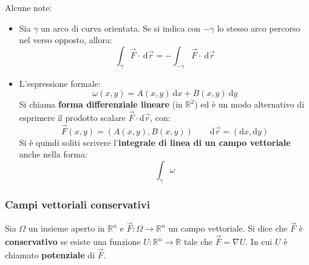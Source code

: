 \documentclass[a4paper]{article}
\newcommand{\definition}[1]{\textcolor{Red3}{\textbf{#1}}}
\begin{document}
	\noindent
	Alcune note:
	\begin{itemize}
		\item Sia $\gamma$ un arco di curva orientata. Se si indica con $-\gamma$ lo stesso arco percorso nel verso opposto, allora:
		\begin{equation*}
			\displaystyle\int_{\gamma} \overset{\rightarrow}{F} \cdot \:\mathrm{d}\overset{\rightarrow}{r} 
			=
			- \displaystyle\int_{-\gamma} \overset{\rightarrow}{F} \cdot \:\mathrm{d}\overset{\rightarrow}{r}
		\end{equation*}

		\item L'espressione formale:
		\begin{equation*}
			\omega\left(x,y\right) = A\left(x,y\right) \:\mathrm{d}x + B\left(x,y\right) \:\mathrm{d}y
		\end{equation*}
		Si chiama \textbf{forma differenziale lineare} (in $\mathbb{R}^{2}$) ed è un modo alternativo di esprimere il prodotto scalare $\overset{\rightarrow}{F} \cdot \mathrm{d}\overset{\rightarrow}{r}$, con:
		\begin{equation*}
			\overset{\rightarrow}{F}\left(x,y\right) = \left(A\left(x,y\right), B\left(x,y\right)\right) \hspace{2em} \mathrm{d}\overset{\rightarrow}{r} = \left(\mathrm{d}x, \mathrm{d}y\right)
		\end{equation*}
		Si è quindi soliti scrivere l'\textbf{integrale di linea di un campo vettoriale} anche nella forma:
		\begin{equation*}
			\displaystyle\int_{\gamma} \omega
		\end{equation*}
	\end{itemize}\newpage

	\subsubsection{Campi vettoriali conservativi}

	\begin{boxdef}
		Sia $\Omega$ un insieme aperto in $\mathbb{R}^{n}$ e $\overset{\rightarrow}{F} : \Omega \rightarrow \mathbb{R}^{n}$ un campo vettoriale. Si dice che $\overset{\rightarrow}{F}$ è \definition{conservativo} se esiste una funzione $U: \mathbb{R}^{n} \rightarrow \mathbb{R}$ tale che $\overset{\rightarrow}{F} = \nabla U$. In cui $U$ è chiamato \textbf{potenziale} di $\overset{\rightarrow}{F}$.
	\end{boxdef}
\end{document}

